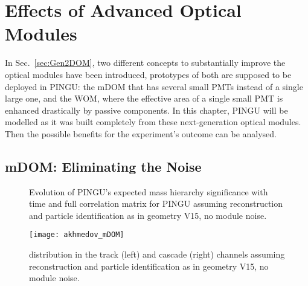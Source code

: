 \section{Effects of Advanced Optical Modules}
\label{sec:om_effects}

In Sec.~\ref{sec:Gen2DOM}, two different concepts to substantially improve the 
optical modules have been introduced, prototypes of both are supposed to be 
deployed in PINGU: the mDOM that has several small PMTs instead of a single 
large one, and the WOM, where the effective area of a single small PMT is 
enhanced drastically by passive components. In this chapter, PINGU will be
modelled as it was built completely from these next-generation optical modules. 
Then the possible benefits for the experiment's outcome can be analysed.

\subsection{mDOM: Eliminating the Noise}
\label{sec:mdom_effect}

\begin{figure}[thp]
 \centering
 \caption{\protect{} Evolution of PINGU's expected
          mass hierarchy significance with time and
          \protect{} full correlation matrix for
          PINGU assuming reconstruction and particle identification as in
          geometry V15, \ie no module noise.}
 \label{fig:time_covmat_mDOM}
\end{figure}

\begin{figure}[hbp]
 \centering
 \texttt{[image: akhmedov\_mDOM]}
 \caption{\delchi distribution in the track (left) and cascade (right) channels
          assuming reconstruction and particle identification as in geometry
          V15, \ie no module noise.}
 \label{fig:akhmedov_mDOM}
\end{figure}

